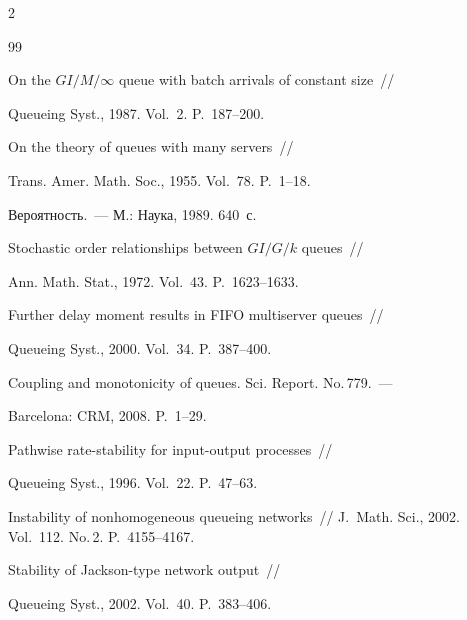 \begin{multicols}{2}
{{\begin{thebibliography}{99}

 On the $GI/M/\infty$ queue with batch arrivals of constant size~// 

Queueing Syst., 1987. Vol.~2. P.~187--200.




 On the theory of queues with many servers~// 

Trans. Amer. Math. Soc., 1955. Vol.~78. P.~1--18.




 Вероятность.~--- М.: Наука, 1989. 640~с.




 Stochastic order relationships between $GI/G/k$ queues~// 

Ann. Math. Stat., 1972. Vol.~43.  P.~1623--1633.




 Further delay moment results in FIFO multiserver queues~// 

Queueing Syst., 2000. Vol.~34. P.~387--400.




  Coupling and monotonicity of queues. Sci. Report. No.\,779.~--- 

Barcelona: CRM, 2008. P.~1--29.



  Pathwise rate-stability for input-output processes~// 

Queueing Syst., 1996. Vol.~22. P.~47--63.




 Instability of nonhomogeneous queueing networks~// J.~Math. Sci., 2002. Vol.~112. No.\,2. P.~4155--4167.




 Stability of Jackson-type network output~// 

Queueing Syst., 2002. Vol.~40. P.~383--406.





\end{thebibliography}}}
\end{multicols}
